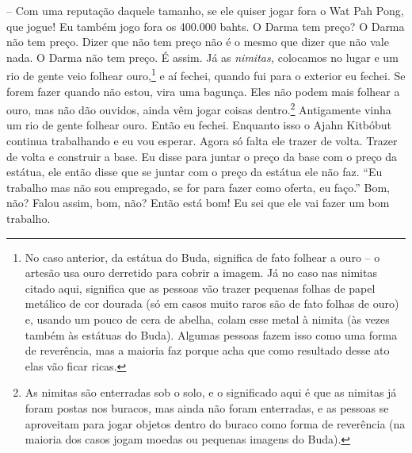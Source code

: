 -- Com uma reputação daquele tamanho, se ele quiser jogar fora o
Wat Pah Pong, que jogue! Eu também jogo fora os 400.000 bahts. O Darma
tem preço? O Darma não tem preço. Dizer que não tem preço não é o mesmo
que dizer que não vale nada. O Darma não tem preço. É assim. Já as
\textit{nimitas,} colocamos no lugar e um rio de gente veio folhear
ouro,\footnote{No caso anterior, da estátua do Buda, significa de fato
folhear a ouro – o artesão usa ouro derretido para cobrir a imagem. Já
no caso nas nimitas citado aqui, significa que as pessoas vão trazer
pequenas folhas de papel metálico de cor dourada (só em casos muito
raros são de fato folhas de ouro) e, usando um pouco de cera de abelha,
colam esse metal à nimita (às vezes também às estátuas do Buda).
Algumas pessoas fazem isso como uma forma de reverência, mas a maioria
faz porque acha que como resultado desse ato elas vão ficar ricas.} e
aí fechei, quando fui para o exterior eu fechei. Se forem fazer quando
não estou, vira uma bagunça. Eles não podem mais folhear a ouro, mas
não dão ouvidos, ainda vêm jogar coisas dentro.\footnote{As nimitas são
enterradas sob o solo, e o significado aqui é que as nimitas já foram
postas nos buracos, mas ainda não foram enterradas, e as pessoas se
aproveitam para jogar objetos dentro do buraco como forma de reverência
(na maioria dos casos jogam moedas ou pequenas imagens do Buda).}
Antigamente vinha um rio de gente folhear ouro. Então eu fechei.
Enquanto isso o Ajahn Kitbóbut continua trabalhando e eu vou esperar.
Agora só falta ele trazer de volta. Trazer de volta e construir a base.
Eu disse para juntar o preço da base com o preço da estátua, ele então
disse que se juntar com o preço da estátua ele não faz. “Eu trabalho
mas não sou empregado, se for para fazer como oferta, eu faço.” Bom,
não? Falou assim, bom, não? Então está bom! Eu sei que ele vai fazer um
bom trabalho.


